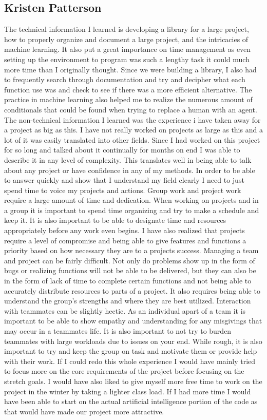 \documentclass[10pt,letterpaper,onecolumn,draftclsnofoot]{IEEEtran}
\begin{document}
\subsection{Kristen Patterson}
The technical information I learned is developing a library for a large project, how to properly organize and document a large project, and the intricacies of machine learning. It also put a great importance on time management as even setting up the environment to program was such a lengthy task it could much more time than I originally thought. Since we were building a library, I also had to frequently search through documentation and try and decipher what each function use was and check to see if there was a more efficient alternative. The practice in machine learning also helped me to realize the numerous amount of conditionals that could be found when trying to replace a human with an agent.
The non-technical information I learned was the experience i have taken away for a project as big as this. I have not really worked on projects as large as this and a lot of it was easily translated into other fields. Since I had worked on this project for so long and talked about it continually for months on end I was able to describe it in any level of complexity. This translates well in being able to talk about any project or have confidence in any of my methods. In order to be able to answer quickly and show that I understand my field clearly I need to just spend time to voice my projects and actions.
Group work and project work require a large amount of time and dedication. When working on projects and in a group it is important to spend time organizing and try to make a schedule and keep it. It is also important to be able to designate time and resources appropriately before any work even begins. I have also realized that projects require a level of compromise and being able to give features and functions a priority based on how necessary they are to a projects success.
Managing a team and project can be fairly difficult. Not only do problems show up in the form of bugs or realizing functions will not be able to be delivered, but they can also be in the form of lack of time to complete certain functions and not being able to accurately distribute resources to parts of a project. It also requires being able to understand the group's strengths and where they are best utilized.
Interaction with teammates can be slightly hectic. As an individual apart of a team it is important to be able to show empathy and understanding for any misgivings that may occur in a teammates life. It is also important to not try to burden teammates with large workloads due to issues on your end. While rough, it is also important to try and keep the group on task and motivate them or provide help with their work.
If I could redo this whole experience I would have mainly tried to focus more on the core requirements of the project before focusing on the stretch goals. I would have also liked to give myself more free time to work on the project in the winter by taking a lighter class load. If I had more time I would have been able to start on the actual artificial intelligence portion of the code as that would have made our project more attractive.
\end{document}
